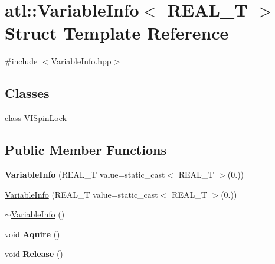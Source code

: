 \hypertarget{structatl_1_1_variable_info}{\section{atl\+:\+:Variable\+Info$<$ R\+E\+A\+L\+\_\+\+T $>$ Struct Template Reference}
\label{structatl_1_1_variable_info}
}


{\ttfamily \#include $<$Variable\+Info.\+hpp$>$}

\subsection*{Classes}
\begin{DoxyCompactItemize}
\item 
class \hyperlink{classatl_1_1_variable_info_1_1_v_i_spin_lock}{V\+I\+Spin\+Lock}
\end{DoxyCompactItemize}
\subsection*{Public Member Functions}
\begin{DoxyCompactItemize}
\item 
\hypertarget{structatl_1_1_variable_info_a12fa37baf1ab3cf03ac7f3a671d7d592}{{\bfseries Variable\+Info} (R\+E\+A\+L\+\_\+\+T value=static\+\_\+cast$<$ R\+E\+A\+L\+\_\+\+T $>$(0.))}\label{structatl_1_1_variable_info_a12fa37baf1ab3cf03ac7f3a671d7d592}

\item 
\hyperlink{structatl_1_1_variable_info_a12fa37baf1ab3cf03ac7f3a671d7d592}{Variable\+Info} (R\+E\+A\+L\+\_\+\+T value=static\+\_\+cast$<$ R\+E\+A\+L\+\_\+\+T $>$(0.))
\item 
\hyperlink{structatl_1_1_variable_info_a64263191d3bc064ca3ea473b09606ecd}{$\sim$\+Variable\+Info} ()
\item 
\hypertarget{structatl_1_1_variable_info_aee605304c83181edf60974dc11647dba}{void {\bfseries Aquire} ()}\label{structatl_1_1_variable_info_aee605304c83181edf60974dc11647dba}

\item 
\hypertarget{structatl_1_1_variable_info_ad0fc1257b3bfc35cc5286535f37ca746}{void {\bfseries Release} ()}\label{structatl_1_1_variable_info_ad0fc1257b3bfc35cc5286535f37ca746}

\end{DoxyCompactItemize}

